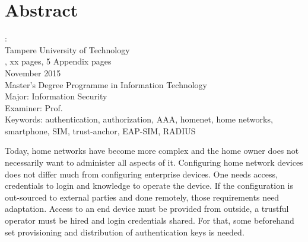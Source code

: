 \documentclass[12pt,a4paper,english]{tutthesis}
\begin{document}
\setcounter{page}{0} %

\chapter*{Abstract}

\begin{spacing}{1.0}
  {\bf \textsf{\MakeUppercase{\@author}}}: \@title\\   %
   \textsf{Tampere University of Technology}\\
   \textsf{\@thesistype, xx pages, 5 Appendix pages} \\
   \textsf{November 2015}\\
   \textsf{Master's Degree Programme in Information Technology}\\
   \textsf{Major: Information Security}\\
   \textsf{Examiner: Prof. \@examiner}\\ %
   \textsf{Keywords: authentication, authorization, AAA, homenet, home networks, smartphone, SIM, trust-anchor, EAP-SIM, RADIUS}\\
\end{spacing}


Today, home networks have become more complex and the home owner 
does not necessarily want to administer all aspects of it.
Configuring home network devices does not differ much from configuring enterprise devices. One needs access, credentials to login and knowledge to operate the device. If the configuration is out-sourced to external parties and 
done remotely, those requirements need adaptation.
Access to an end device must be provided from outside, a trustful operator must be hired and login credentials shared.
For that,  some beforehand set provisioning and distribution of authentication keys is needed.
\end{document}
